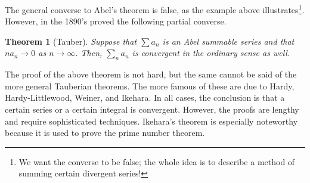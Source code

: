 \documentclass[12pt]{article}
\newtheorem{theorem}[proposition]{Theorem}
\begin{document}
The general converse to Abel's theorem is false, as the example above
illustrates\footnote{We want the converse to be false; the whole idea
  is to describe a method of summing certain divergent series!}.
However, in the 1890's
proved the following partial converse.
\begin{theorem}[Tauber]
Suppose that $\sum a_n$ is an Abel summable series and that $n a_n
\rightarrow 0$ as $n\rightarrow \infty$.  Then, $\sum_n a_n$ is
convergent in the ordinary sense as well.  
\end{theorem}
The proof of the above theorem is not hard, but the same cannot be
said of the more general Tauberian theorems.  The more famous of these
are due to Hardy, Hardy-Littlewood, Weiner, and Ikehara.  In all
cases, the conclusion is that a certain series or a certain integral
is convergent.  However, the proofs are lengthy and require
sophisticated techniques.  Ikehara's theorem is especially noteworthy
because it is used to prove the prime number theorem.
\end{document}
